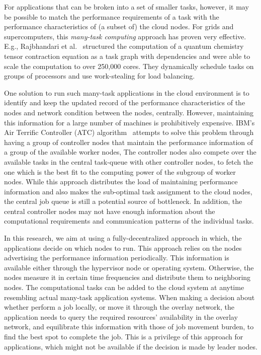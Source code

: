 \documentclass{sig-alternate}
\begin{document}
For applications that can be broken into a set of smaller tasks, however, it may be possible to match the performance requirements of a task with the performance characteristics of (a subset of) the cloud nodes.  For grids and supercomputers, this {\em many-task computing\/} approach \cite{raicu:many} has proven very effective.  E.g., Raj\-bhandari et al.~\cite{Sriram_SC14b} structured the computation of a quantum chemistry tensor contraction equation as a task graph with dependencies and were able to scale the computation to over 250,000 cores.  They dynamically schedule tasks on groups of processors and
use work-stealing for load balancing.

One solution to run such many-task applications in the cloud environment is to identify and keep the updated record of the performance characteristics of the nodes and network condition between the nodes, centrally. However, maintaining this information for a large number of machines is prohibitively expensive. IBM's Air Terrific Controller (ATC) algorithm~\cite{barsness:2014:Distributed} attempts to solve this problem through having a group of controller nodes that maintain the performance information of a group of the available worker nodes, The controller nodes also compete over the available tasks in the central task-queue with other controller nodes, to fetch the one which is the best fit to the computing power of the subgroup of worker nodes. While this approach distributes the load of maintaining performance information and also makes the sub-optimal task assignment to the cloud nodes, the central job queue is still a potential source of bottleneck. In addition, the central controller nodes may not have enough information about the computational requirements and communication patterns of the individual tasks.

In this research, we aim at using a fully-decentralized approach in which, the applications decide on which nodes to run. This approach relies on the nodes advertising the performance information periodically. This information is available either through the hypervisor node or operating system. Otherwise, the nodes measure it in certain time frequencies and distribute them to neighboring nodes. The computational tasks can be added to the cloud system at anytime resembling actual many-task application systems. When making a decision about whether perform a job locally, or move it through the overlay network, the application needs to query the required resources' availability in the overlay network, and equilibrate this information with those of job movement burden, to find the best spot to complete the job. This is a privilege of this approach for applications, which might not be available if the decision is made by leader nodes. 
\end{document}
